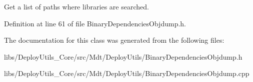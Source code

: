 Get a list of paths where libraries are searched. 



Definition at line 61 of file Binary\+Dependencies\+Objdump.\+h.



The documentation for this class was generated from the following files\+:\begin{DoxyCompactItemize}
\item 
libs/\+Deploy\+Utils\+\_\+\+Core/src/\+Mdt/\+Deploy\+Utils/Binary\+Dependencies\+Objdump.\+h\item 
libs/\+Deploy\+Utils\+\_\+\+Core/src/\+Mdt/\+Deploy\+Utils/Binary\+Dependencies\+Objdump.\+cpp\end{DoxyCompactItemize}
